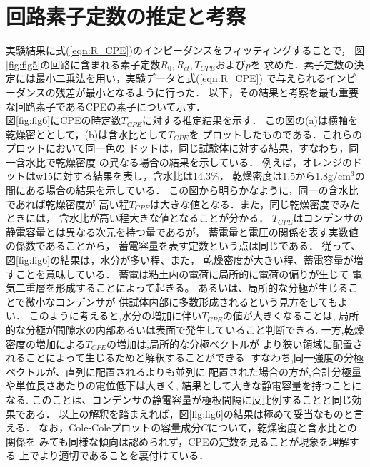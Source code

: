 \documentclass{jsce}
\begin{document}
\section{回路素子定数の推定と考察}
実験結果に式(\ref{eqn:R_CPE})のインピーダンスをフィッティングすることで，
図\ref{fig:fig5}の回路に含まれる素子定数$R_0,R_{ct},T_{CPE}$および$p$を
求めた．素子定数の決定には最小二乗法を用い，実験データと式(\ref{eqn:R_CPE})
で与えられるインピーダンスの残差が最小となるように行った．
以下，その結果と考察を最も重要な回路素子であるCPEの素子について示す．
\\
図\ref{fig:fig6}にCPEの時定数$T_{CPE}$に対する推定結果を示す．
この図の(a)は横軸を乾燥密ととして，(b)は含水比として$T_{CPE}$を
プロットしたものである．これらのプロットにおいて同一色の
ドットは，同じ試験体に対する結果，すなわち，同一含水比で乾燥密度
の異なる場合の結果を示している．
例えば，オレンジのドットはw15に対する結果を表し，含水比は14.3\%，
乾燥密度は1.5から1.8g/cm$^3$の間にある場合の結果を示している．
この図から明らかなように，同一の含水比であれば乾燥密度が
高い程$T_{CPE}$は大きな値となる．また，同じ乾燥密度でみたときには，
含水比が高い程大きな値となることが分かる．
$T_{CPE}$はコンデンサの静電容量とは異なる次元を持つ量であるが，
蓄電量と電圧の関係を表す実数値の係数であることから，
蓄電容量を表す定数という点は同じである．
従って、図\ref{fig:fig6}の結果は，水分が多い程、また，
乾燥密度が大きい程、蓄電容量が増すことを意味している．
蓄電は粘土内の電荷に局所的に電荷の偏りが生じて
電気二重層を形成することによって起きる。
あるいは、局所的な分極が生じることで微小なコンデンサが
供試体内部に多数形成されるという見方をしてもよい．
このように考えると,水分の増加に伴い$T_{CPE}$の値が大きくなることは,
局所的な分極が間隙水の内部あるいは表面で発生していること判断できる.
一方,乾燥密度の増加による$T_{CPE}$の増加は,局所的な分極ベクトルが
より狭い領域に配置されることによって生じるためと解釈することができる.
すなわち,同一強度の分極ベクトルが、直列に配置されるよりも並列に
配置された場合の方が,合計分極量や単位長さあたりの電位低下は大きく,
結果として大きな静電容量を持つことになる.
このことは、コンデンサの静電容量が極板間隔に反比例することと同じ効果である．
以上の解釈を踏まえれば，図\ref{fig:fig6}の結果は極めて妥当なものと言える．
なお，Cole-Coleプロットの容量成分$C$について，乾燥密度と含水比との関係を
みても同様な傾向は認められず，CPEの定数を見ることが現象を理解する
上でより適切であることを裏付けている．
\end{document}
